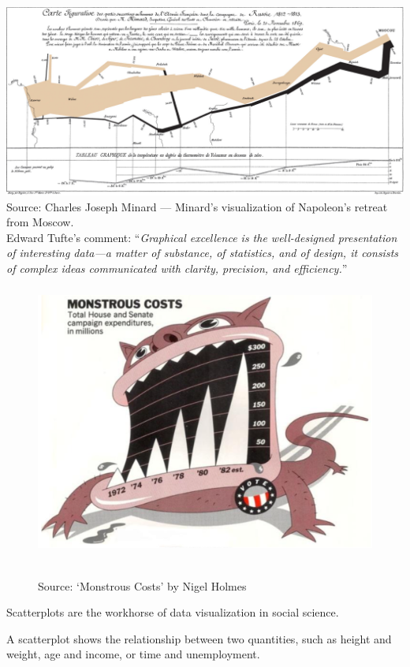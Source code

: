 \documentclass[11pt]{beamer}
\begin{document}
\begin{frame}
	
	\frametitle{\bfseries}
	\vspace{-1em}
	{\centering
		\includegraphics[width=1\linewidth]{Figure/minard}
		\\ 	\vspace{-1em}
		\tiny{Source: Charles Joseph Minard --- Minard’s visualization of Napoleon’s retreat from Moscow.}}\\
	\footnotesize {Edward Tufte's comment: ``\textit{Graphical excellence is the well-designed presentation of interesting data—a matter of substance, of statistics, and of design, it consists of complex ideas communicated with clarity, precision, and efficiency.}''}
\end{frame}


\begin{frame}
	
	\frametitle{\bfseries}
	\begin{figure}
		\vspace{-.5em}
		\includegraphics[width=0.6\linewidth]{Figure/holmes-monstrous-only}

		\\
		\tiny{Source: `Monstrous Costs’ by Nigel Holmes}
		\label{fig:anscombe-1}
	\end{figure}
	\begin{itemize}
		\footnotesize{
			\item Scatterplots are the workhorse of data visualization in social science.
			\item A scatterplot shows the relationship between two quantities, such as height and weight, age and income, or time and unemployment. }
	\end{itemize}
\end{frame}
\end{document}

